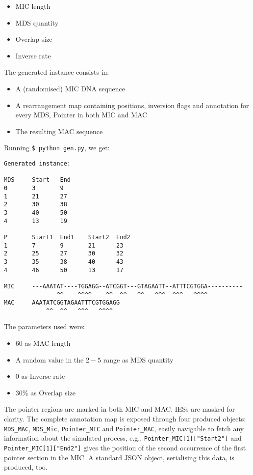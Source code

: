 \begin{itemize}
	\item MIC length
	\item MDS quantity
	\item Overlap size
	\item Inverse rate
\end{itemize}

The generated instance consists in:

\begin{itemize}
	\item A (randomised) MIC DNA sequence
	\item A rearrangement map containing positions, inversion flags and annotation for every MDS, Pointer in both MIC and MAC
	\item The resulting MAC sequence
\end{itemize}

Running \texttt{\$ python gen.py}, we get:
\begin{verbatim}
Generated instance:

MDS     Start   End
0       3       9
1       21      27
2       30      38
3       40      50
4       13      19

P       Start1  End1    Start2  End2
1       7       9       21      23
2       25      27      30      32
3       35      38      40      43
4       46      50      13      17

MIC     ---AAATAT----TGGAGG--ATCGGT---GTAGAATT--ATTTCGTGGA----------
               ^^    ^^^^    ^^  ^^   ^^   ^^^  ^^^   ^^^^
MAC     AAATATCGGTAGAATTTCGTGGAGG
            ^^  ^^   ^^^   ^^^^
\end{verbatim}
The parameters used were:

\begin{itemize}
	\item $60$ as MAC length
	\item A random value in the $2-5$ range as MDS quantity
	\item $0$ as Inverse rate
	\item $30\%$ as Overlap size
\end{itemize}

The pointer regions are marked in both MIC and MAC. IESs are masked for clarity. The complete annotation map is exposed through four produced objects: \texttt{MDS\_MAC}, \texttt{MDS\_Mic}, \texttt{Pointer\_MIC} and \texttt{Pointer\_MAC}, easily navigable to fetch any information about the simulated process, e.g., \texttt{Pointer\_MIC[1]["Start2"]} and \texttt{Pointer\_MIC[1]["End2"]} gives the position of the second occurrence of the first pointer section in the MIC. A standard JSON object, serialising this data, is produced, too.

